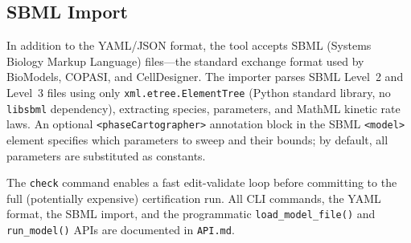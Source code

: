 \documentclass[11pt]{article}
\begin{document}
\subsection{SBML Import}

In addition to the YAML/JSON format, the tool accepts SBML (Systems Biology Markup Language) files---the standard exchange format used by BioModels, COPASI, and CellDesigner. The importer parses SBML Level~2 and Level~3 files using only \texttt{xml.etree.ElementTree} (Python standard library, no \texttt{libsbml} dependency), extracting species, parameters, and MathML kinetic rate laws. An optional \texttt{<phaseCartographer>} annotation block in the SBML \texttt{<model>} element specifies which parameters to sweep and their bounds; by default, all parameters are substituted as constants.

The \texttt{check} command enables a fast edit-validate loop before committing to the full (potentially expensive) certification run. All CLI commands, the YAML format, the SBML import, and the programmatic \texttt{load\_model\_file()} and \texttt{run\_model()} APIs are documented in \texttt{API.md}.
\end{document}
